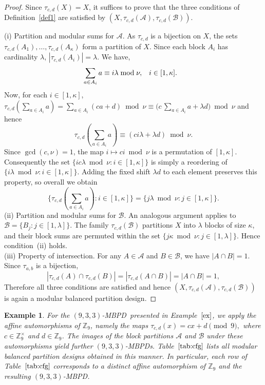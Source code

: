 \documentclass[preprint,11pt]{elsarticle}
\newcommand{\MBPD}{\textnormal{MBPD}}
\newtheorem{example}[theorem]{Example}
\begin{document}
\begin{proof}
Since $\tau_{c,d}(X) = X$, it suffices to prove that the three conditions of Definition~\ref{def1} are satisfied by 
\(
(X, \tau_{c,d}(\mathcal{A}), \tau_{c,d}(\mathcal{B})).
\)

\noindent (i) Partition and modular sums for $\mathcal{A}$. 
As $\tau_{c,d}$ is a bijection on $X$, the sets $\tau_{c,d}(A_1),\dots,\tau_{c,d}(A_\kappa)$ form a partition of $X$. Since each block $A_i$ has cardinality $\lambda$, $|\tau_{c,d}(A_i)|=\lambda$.   We have,
\begin{align}{\label{eqn10}}
\sum_{a\in A_i}a \equiv i\lambda \bmod{\nu}, ~~~& i\in [1,\kappa].
\end{align}
Now, for each $i\in [1,\kappa]$, $
\tau_{c,d}(\sum_{a\in A_i}a) = \sum_{a\in A_i}(ca+d)\bmod{\nu} \equiv \bigl(c\,\sum_{a\in A_i}a + \lambda d \bigr)\bmod{\nu}$ and hence 
\[
\tau_{c,d}(\sum_{a\in A_i}a) \equiv \left(ci\lambda + \lambda d\right) \bmod{\nu}.
\]
Since $\gcd(c,\nu)=1$, the map $i \mapsto ci \bmod{\nu}$ is a permutation of $[1,\kappa]$. 
Consequently the set
\(
\{ ic\lambda\bmod{\nu} : i\in [1,\kappa] \} 
\)
is simply a reordering of $\{ i\lambda\bmod{\nu} : i\in [1,\kappa] \}$. 
Adding the fixed shift $\lambda d$ to each element preserves this property, so overall we obtain
\[
\{ \tau_{c,d}(\sum_{a\in A_i}a) : i\in [1,\kappa] \}
= \{ j\lambda \bmod{\nu} : j\in [1,\kappa] \}.
\]
\noindent (ii) Partition and modular sums for $\mathcal{B}$. 
An analogous argument applies to $\mathcal{B}=\{B_j: j \in [1,\lambda]\}$. The family $\tau_{c,d}(\mathcal{B})$ partitions $X$ into $\lambda$ blocks of size $\kappa$, and their block sums are permuted within the set $\{ j\kappa \bmod{\nu} : j\in[1,\lambda]\}$. Hence condition~(ii) holds.\\

\noindent (iii) Property of intersection.
For any $A\in\mathcal{A}$ and $B\in\mathcal{B}$, we have $|A\cap B|=1$. Since $\tau_{a,b}$ is a bijection,
\[
|\tau_{c,d}(A)\cap \tau_{c,d}(B)| = |\tau_{c,d}(A\cap B)| = |A\cap B| = 1,
\]
Therefore all three conditions are satisfied and hence
\(
(X, \tau_{c,d}(\mathcal{A}), \tau_{c,d}(\mathcal{B}))
\)
is again a modular balanced partition design.
\end{proof}
\begin{example}
 For the $(9,3,3)$-\MBPD ~presented in Example~$\ref{ex}$, we apply the affine automorphisms of $\mathbb{Z}_9$, namely the maps
\(
\tau_{c,d}(x)=cx+d \pmod 9,
\)
where $c\in\mathbb{Z}_9^{\times}$ and $d\in\mathbb{Z}_9$. The images of the block partitions $\mathcal{A}$ and $\mathcal{B}$ under these automorphisms yield further $(9,3,3)$-\MBPD s. Table~$\ref{tab:cfg}$ lists all modular balanced partition designs obtained in this manner. In particular, each row of Table~$\ref{tab:cfg}$ corresponds to a distinct affine automorphism of $\mathbb{Z}_9$ and the resulting $(9,3,3)$-\MBPD.
\end{example}
\end{document}
